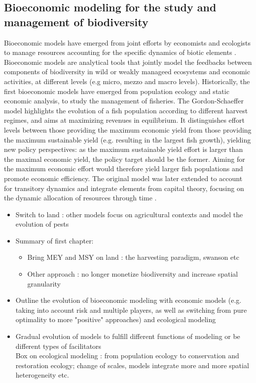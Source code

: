\subsection*{Bioeconomic modeling for the study and management of biodiversity}

Bioeconomic models \citep{Gordon1954, smith_models_1969, clark_profit_1973} have emerged from joint efforts by economists and ecologists to manage resources accounting for the specific dynamics of biotic elements \citep{Parent_Mouysset_Missemer_Levrel_2024}. Bioeconomic models are analytical tools that jointly model the feedbacks between components of biodiversity in wild or weakly manageed ecosystems and economic activities, at different levels (e.g micro, mezzo and macro levels). 
Historically, the first bioeconomic models have emerged from population ecology and static economic analysis, to study the management of fisheries. The Gordon-Schaeffer model highlights the evolution of a fish population according to different harvest regimes, and aims at maximizing revenues in equilibrium. It distinguishes effort levels between those providing the maximum economic yield from those providing the maximum sustainable yield (e.g. resulting in the largest fish growth), yielding new policy perspectives: as the maximum sustainable yield effort is larger than the maximal economic yield, the policy target should be the former. Aiming for the maximum economic effort would therefore yield larger fish populations and promote economic efficiency. The original model was later extended to account for transitory dynamics and integrate elements from capital theory, focusing on the dynamic allocation of resources through time \citep{smith_models_1969, clark_profit_1973}. 

\begin{itemize}
\item Switch to land : other models focus on agricultural contexts and model the evolution of pests
\item Summary of first chapter:
\begin{itemize}
\item Bring MEY and MSY on land : the harvesting paradigm, swanson etc
\item Other approach : no longer monetize biodiversity and increase spatial granularity
\end{itemize}

\item Outline the evolution of bioeconomic modeling with economic models (e.g. taking into account risk and multiple players, as well as switching from pure optimality to more "positive" approaches) and ecological modeling
\item Gradual evolution of models to fulfill different functions of modeling or be different types of facilitators
\\
Box on ecological modeling : from population ecology to conservation and restoration ecology; change of scales, models integrate more and more spatial heterogeneity etc. 
\end{itemize}

